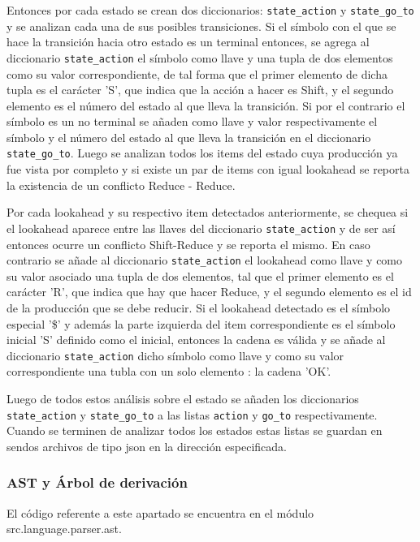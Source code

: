 Entonces por cada estado se crean dos diccionarios: \verb|state_action| y \verb|state_go_to| y se analizan cada una de sus posibles transiciones. Si el s\'imbolo con el que se hace la transici\'on hacia otro estado es un terminal entonces, se agrega al diccionario \verb|state_action| el s\'imbolo como llave y una tupla de dos elementos como su valor correspondiente, de tal forma que el primer elemento de dicha tupla es el car\'acter 'S', que indica que la acci\'on a hacer es Shift, y el segundo elemento es el n\'umero del estado al que lleva la transici\'on. Si por el contrario el s\'imbolo es un no terminal se a\~{n}aden como llave y valor respectivamente el s\'imbolo y el n\'umero del estado al que lleva la transici\'on en el diccionario \verb|state_go_to|. Luego se analizan todos los items del estado cuya producci\'on ya fue vista por completo y si existe un par de items con igual lookahead se reporta la existencia de un conflicto Reduce - Reduce.

Por cada lookahead y su respectivo item detectados anteriormente, se chequea si el lookahead aparece entre las llaves del diccionario \verb|state_action| y de ser as\'i entonces ocurre un conflicto Shift-Reduce y se reporta el mismo. En caso contrario se a\~{n}ade al diccionario \verb|state_action| el lookahead como llave y como su valor asociado una tupla de dos elementos, tal que el primer elemento es el car\'acter 'R', que indica que hay que hacer Reduce, y el segundo elemento es el id de la producci\'on que se debe reducir. Si el lookahead detectado es el s\'imbolo especial '\$' y adem\'as la parte izquierda del item correspondiente es el s\'imbolo inicial 'S' definido como el inicial, entonces la cadena es v\'alida y se a\~{n}ade al diccionario \verb|state_action| dicho s\'imbolo como llave y como su valor correspondiente una tubla con un solo elemento : la cadena 'OK'. 

Luego de todos estos an\'alisis sobre el estado se a\~{n}aden los diccionarios \verb|state_action| y \verb|state_go_to| a las listas \verb|action| y \verb|go_to| respectivamente. Cuando se terminen de analizar todos los estados estas listas se guardan en sendos archivos de tipo json en la direcci\'on especificada.

\subsubsection{AST y \'Arbol de derivaci\'on}
El c\'odigo referente a este apartado se encuentra en el m\'odulo src.language.parser.ast.

